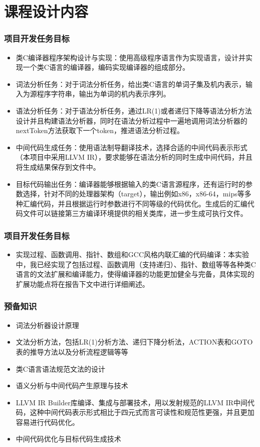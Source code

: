 \section{课程设计内容}
\begin{frame}
    \frametitle{项目开发任务目标}
    \footnotesize
    \begin{itemize}
        \item {类C编译器程序架构设计与实现：使用高级程序语言作为实现语言，设计并实现一个类C语言的编译器，编码实现编译器的组成部分。}
        \item {词法分析任务：对于词法分析任务，给出类C语言的单词子集及机内表示，输入为源程序字符串，输出为单词的机内表示序列。}
        \item {语法分析任务：对于语法分析任务，通过LR(1)或者递归下降等语法分析方法设计并且构建语法分析器，同时在语法分析过程中一遍地调用词法分析器的nextToken方法获取下一个token，推进语法分析过程。}
        \item {中间代码生成任务：使用语法制导翻译技术，选择合适的中间代码表示形式（本项目中采用LLVM IR），要求能够在语法分析的同时生成中间代码，并且将生成结果保存到文件中。}
        \item {目标代码输出任务：编译器能够根据输入的类C语言源程序，还有运行时的参数选择，针对不同的处理器架构（target），输出例如x86，x86-64，mips等多种汇编代码，并且根据运行时参数进行不同等级的代码优化。生成后的汇编代码文件可以链接第三方编译环境提供的相关类库，进一步生成可执行文件。}
    \end{itemize}
\end{frame}

\begin{frame}
    \frametitle{项目开发任务目标}
    \footnotesize
    \begin{itemize}
        \item {实现过程、函数调用、指针、数组和GCC风格内联汇编的代码编译：本实验中，我已经实现了包括过程、函数调用（支持递归）、指针、数组等等各种类C语言的文法扩展和编译能力，使得编译器的功能更加健全与完备，具体实现的扩展功能点将在报告下文中进行详细阐述。}
    \end{itemize}
\end{frame}

\begin{frame}
    \frametitle{预备知识}
    \footnotesize
    \begin{itemize}
        \item {词法分析器设计原理}
        \item {文法分析方法，包括LR(1)分析方法、递归下降分析法，ACTION表和GOTO表的推导方法以及分析流程逻辑等等}
        \item {类C语言语法规范文法的设计}
        \item {语义分析与中间代码产生原理与技术}
        \item {LLVM IR Builder库编译、集成与部署技术，用以发射规范的LLVM IR中间代码，这种中间代码表示形式相比于四元式而言可读性和规范性更强，并且更加容易进行代码优化。}
        \item {中间代码优化与目标代码生成技术}
    \end{itemize}
\end{frame}

